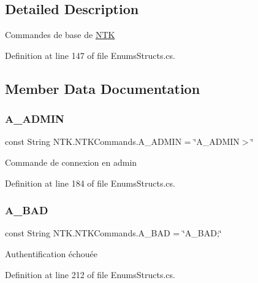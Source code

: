 \subsection{Detailed Description}
Commandes de base de \mbox{\hyperlink{namespace_n_t_k}{N\+TK}} 



Definition at line 147 of file Enums\+Structs.\+cs.



\subsection{Member Data Documentation}
\mbox{\label{struct_n_t_k_1_1_n_t_k_commands_acdd4bd5a7ed9cb74be22c2338bdcb13b}} 
\subsubsection{\texorpdfstring{A\_ADMIN}{A\_ADMIN}}
{\footnotesize\ttfamily const String N\+T\+K.\+N\+T\+K\+Commands.\+A\+\_\+\+A\+D\+M\+IN = \char`\"{}A\+\_\+\+A\+D\+M\+IN$>$\char`\"{}}



Commande de connexion en admin 



Definition at line 184 of file Enums\+Structs.\+cs.

\mbox{\label{struct_n_t_k_1_1_n_t_k_commands_a388ee71163f9457a1474447de4a73c14}} 
\subsubsection{\texorpdfstring{A\_BAD}{A\_BAD}}
{\footnotesize\ttfamily const String N\+T\+K.\+N\+T\+K\+Commands.\+A\+\_\+\+B\+AD = \char`\"{}A\+\_\+\+B\+AD;\char`\"{}}



Authentification échouée 



Definition at line 212 of file Enums\+Structs.\+cs.

\mbox{\label{struct_n_t_k_1_1_n_t_k_commands_a5d8654e1359fd7cb2f284dab2713cf4a}} 
